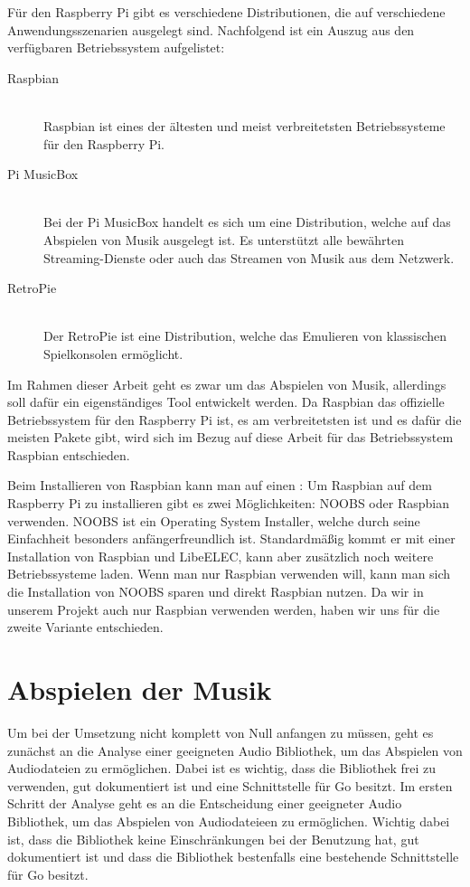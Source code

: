 Für den Raspberry Pi gibt es verschiedene Distributionen, die auf verschiedene
Anwendungsszenarien ausgelegt sind. Nachfolgend ist ein Auszug aus den verfügbaren
Betriebssystem aufgelistet: 
\begin{description}
\item[Raspbian] \hfill \\ 
    Raspbian ist eines der ältesten und meist verbreitetsten Betriebssysteme für
    den Raspberry Pi. 
\item[Pi MusicBox] \hfill \\ 
    Bei der Pi MusicBox handelt es sich um eine Distribution, welche auf das
    Abspielen von Musik ausgelegt ist. Es unterstützt alle bewährten
    Streaming-Dienste oder auch das Streamen von Musik aus dem Netzwerk.
\item[RetroPie] \hfill \\
    Der RetroPie ist eine Distribution, welche das Emulieren von klassischen
    Spielkonsolen ermöglicht.
\end{description}

Im Rahmen dieser Arbeit geht es zwar um das Abspielen von Musik, allerdings
soll dafür ein eigenständiges Tool entwickelt werden. Da Raspbian das
offizielle Betriebssystem für den Raspberry Pi ist, es am verbreitetsten ist
und es dafür die meisten Pakete gibt, wird sich im Bezug auf diese Arbeit für
das Betriebssystem Raspbian entschieden. \hfill \break

Beim Installieren von Raspbian kann man auf einen :
Um Raspbian auf dem Raspberry Pi zu installieren gibt es zwei Möglichkeiten:
\ac{NOOBS} oder Raspbian verwenden. \ac{NOOBS} ist ein Operating System
Installer, welche durch seine Einfachheit besonders anfängerfreundlich ist.
Standardmäßig kommt er mit einer Installation von Raspbian und LibeELEC, kann
aber zusätzlich noch weitere Betriebssysteme laden. Wenn man nur Raspbian
verwenden will, kann man sich die Installation von \ac{NOOBS} sparen und direkt
Raspbian nutzen. Da wir in unserem Projekt auch nur Raspbian verwenden werden,
haben wir uns für die zweite Variante entschieden.


\section{Abspielen der Musik}
Um bei der Umsetzung nicht komplett von Null anfangen zu müssen, geht es
zunächst an die Analyse einer geeigneten Audio Bibliothek, um das Abspielen von
Audiodateien zu ermöglichen. Dabei ist es wichtig, dass die Bibliothek frei zu
verwenden, gut dokumentiert ist und eine Schnittstelle für Go besitzt.  Im
ersten Schritt der Analyse geht es an die Entscheidung einer geeigneter Audio
Bibliothek, um das Abspielen von Audiodateieen zu ermöglichen. Wichtig dabei
ist, dass die Bibliothek keine Einschränkungen bei der Benutzung hat, gut
dokumentiert ist und dass die Bibliothek bestenfalls eine bestehende
Schnittstelle für Go besitzt.
